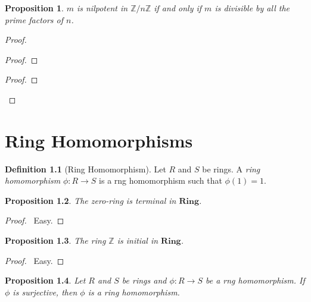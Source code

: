 \documentclass{book}
\let\qed\relax
\newtheorem{prop}{Proposition}[chapter]
\theoremstyle{definition}
\newtheorem{df}[prop]{Definition}
\renewcommand{\mod}{\ensuremath{\operatorname{mod}}}
\begin{document}
\begin{prop}
$m$ is nilpotent in $\mathbb{Z} / n \mathbb{Z}$ if and only if $m$ is divisible by all the prime factors of $n$.
\end{prop}

\begin{proof}
\pf
{}
\begin{proof}
	\step{a}{\assume{$m^a \equiv 0 (\mod n)$}}
\end{proof}
\begin{proof}
	\step{e}{$m^a \equiv 0 (\mod n)$}
\end{proof}
\qed
\end{proof}

\chapter{Ring Homomorphisms}

\begin{df}[Ring Homomorphism]
Let $R$ and $S$ be rings. A \emph{ring homomorphism} $\phi : R \rightarrow S$ is a rng homomorphism such that $\phi(1) = 1$.
\end{df}

\begin{prop}
The zero-ring is terminal in $\mathbf{Ring}$.
\end{prop}

\begin{proof}
\pf\ Easy. \qed
\end{proof}

\begin{prop}
The ring $\mathbb{Z}$ is initial in $\mathbf{Ring}$.
\end{prop}

\begin{proof}
\pf\ Easy. \qed
\end{proof}

\begin{prop}
Let $R$ and $S$ be rings and $\phi : R \rightarrow S$ be a rng homomorphism. If $\phi$ is surjective, then $\phi$ is a ring homomorphism.
\end{prop}
\end{document}
